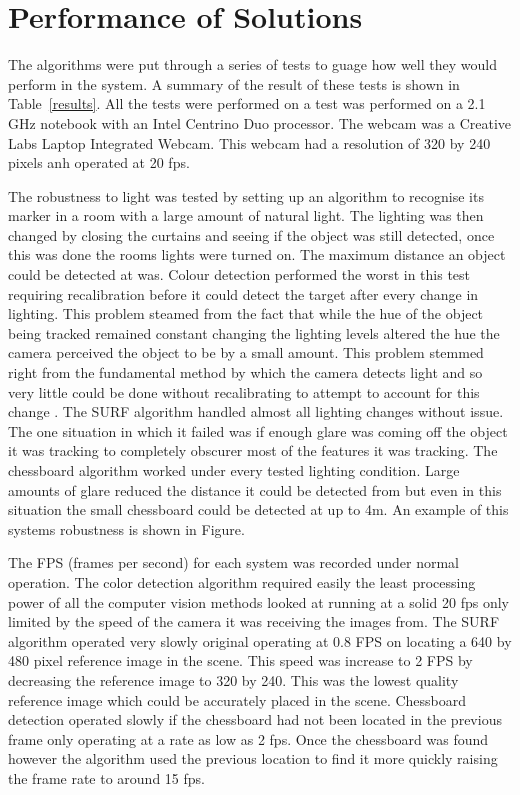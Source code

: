 \section{Performance of Solutions}
The algorithms were put through a series of tests to guage how well they would perform in the system. A summary of the result of these tests is shown in Table~\ref{results}. All the tests were performed on a test was performed on a 2.1 GHz notebook with an Intel Centrino Duo processor. The webcam was a Creative Labs Laptop Integrated Webcam. This webcam had a resolution of 320 by 240 pixels anh operated at 20 fps.

The robustness to light was tested by setting up an algorithm to recognise its marker in a room with a large amount of natural light. The lighting was then changed by closing the curtains and seeing if the object was still detected, once this was done the rooms lights were turned on. The maximum distance an object could be detected at was. Colour detection performed the worst in this test requiring recalibration before it could detect the target after every change in lighting. This problem steamed from the fact that while the hue of the object being tracked remained constant changing the lighting levels altered the hue the camera perceived the object to be by a small amount. This problem stemmed right from the fundamental method by which the camera detects light and so very little could be done without recalibrating to attempt to account for this change \cite{detect}. The SURF algorithm handled almost all lighting changes without issue. The one situation in which it failed was if enough glare was coming off the object it was tracking to completely obscurer most of the features it was tracking. The chessboard algorithm worked under every tested lighting condition. Large amounts of glare reduced the distance it could be detected from but even in this situation the small chessboard could be detected at up to 4m. An example of this systems robustness is shown in Figure.

The FPS (frames per second) for each system was recorded under normal operation. The color detection algorithm required easily the least processing power of all the computer vision methods looked at running at a solid 20 fps only limited by the speed of the camera it was receiving the images from. The SURF algorithm operated very slowly original operating at 0.8 FPS on locating a 640 by 480 pixel reference image in the scene. This speed was increase to 2 FPS by decreasing the reference image to 320 by 240. This was the lowest quality reference image which could be accurately placed in the scene. Chessboard detection operated slowly if the chessboard had not been located in the previous frame only operating at a rate as low as 2 fps. Once the chessboard was found however the algorithm used the previous location to find it more quickly raising the frame rate to around 15 fps.

